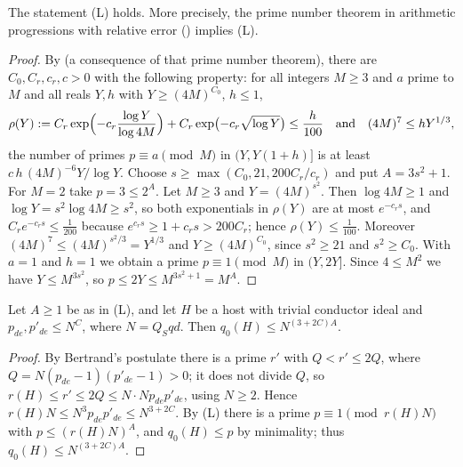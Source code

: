 \begin{lemma}\label{pf:stageU:smallprime}
The statement \textup{(L)} holds. More precisely, the prime number theorem in arithmetic progressions with relative error
\textup{()} implies \textup{(L)}.
\end{lemma}

\begin{proof}
By  (a consequence of that prime number theorem), there are
$C_0,C_r,c_r,c>0$ with the following property: for all integers $M\ge3$ and $a$ prime to $M$ and all reals $Y,h$ with
$Y\ge(4M)^{C_0}$, $h\le1$,
\[
\rho(Y):=C_r\exp\Bigl(-c_r\frac{\log Y}{\log4M}\Bigr)+C_r\exp\bigl(-c_r\sqrt{\log Y}\bigr)\le\frac h{100}
\quad\text{and}\quad(4M)^7\le hY^{1/3},
\]
the number of primes $p\equiv a\pmod M$ in $(Y,Y(1+h)]$ is at least $c\,h\,(4M)^{-6}Y/\log Y$. Choose
$s\ge\max(C_0,21,200C_r/c_r)$ and put $A=3s^2+1$. For $M=2$ take $p=3\le2^A$. Let $M\ge3$ and $Y=(4M)^{s^2}$. Then
$\log4M\ge1$ and $\log Y=s^2\log4M\ge s^2$, so both exponentials in $\rho(Y)$ are at most $e^{-c_rs}$, and
$C_re^{-c_rs}\le\frac1{200}$ because $e^{c_rs}\ge1+c_rs>200C_r$; hence $\rho(Y)\le\frac1{100}$. Moreover
$(4M)^7\le(4M)^{s^2/3}=Y^{1/3}$ and $Y\ge(4M)^{C_0}$, since $s^2\ge21$ and $s^2\ge C_0$. With $a=1$ and $h=1$ we obtain a
prime $p\equiv1\pmod M$ in $(Y,2Y]$. Since $4\le M^2$ we have $Y\le M^{3s^2}$, so $p\le2Y\le M^{3s^2+1}=M^A$.
\end{proof}

\begin{lemma}\label{pf:stageU:q0bound}
Let $A\ge1$ be as in \textup{(L)}, and let $H$ be a host with trivial conductor ideal and $p_{de},p'_{de}\le N^{C}$, where
$N=Q_Sqd$. Then $q_0(H)\le N^{(3+2C)A}$.
\end{lemma}

\begin{proof}
By Bertrand's postulate there is a prime $r'$ with $Q<r'\le2Q$, where $Q=N(p_{de}-1)(p'_{de}-1)>0$; it does not divide
$Q$, so $r(H)\le r'\le2Q\le N\cdot Np_{de}p'_{de}$, using $N\ge2$. Hence $r(H)N\le N^3p_{de}p'_{de}\le N^{3+2C}$. By (L)
there is a prime $p\equiv1\pmod{r(H)N}$ with $p\le(r(H)N)^A$, and $q_0(H)\le p$ by minimality; thus
$q_0(H)\le N^{(3+2C)A}$.
\end{proof}

